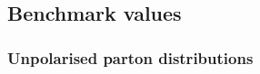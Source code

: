 \subsection{Benchmark values}
\label{subsec:BN}

\subsubsection{Unpolarised parton distributions}

%
%
%


